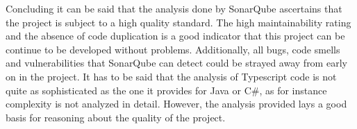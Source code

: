 Concluding it can be said that the analysis done by SonarQube ascertains that the project is subject to a high quality standard. The high maintainability rating and the absence of code duplication is a good indicator that this project can be continue to be developed without problems. Additionally, all bugs, code smells and vulnerabilities that SonarQube can detect could be strayed away from early on in the project. It has to be said that the analysis of Typescript code is not quite as sophisticated as the one it provides for Java or C\#, as for instance complexity is not analyzed in detail. However, the analysis provided lays a good basis for reasoning about the quality of the project.  
